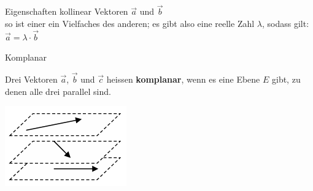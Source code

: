 \begin{theorem}{Eigenschaften kollinear Vektoren} $\vec{a}$ und $\vec{b}$\\
    so ist einer ein Vielfaches des anderen; 
    es gibt also eine reelle Zahl $\lambda$, sodass gilt: $\vec{a}=\lambda\cdot\vec{b}$
\end{theorem}



\begin{definition}{Komplanar}
    
    \begin{minipage}{0.8\linewidth}
        Drei Vektoren $\vec{a}$, $\vec{b}$ und $\vec{c}$ heissen \textbf{komplanar}, 
        wenn es eine Ebene $E$ gibt, zu denen alle drei parallel sind.
    \end{minipage}
    \hspace{1mm}
    \begin{minipage}{0.15\linewidth}
        \includegraphics[width=\linewidth]{vec-komplanar.png}
    \end{minipage}
\end{definition}

